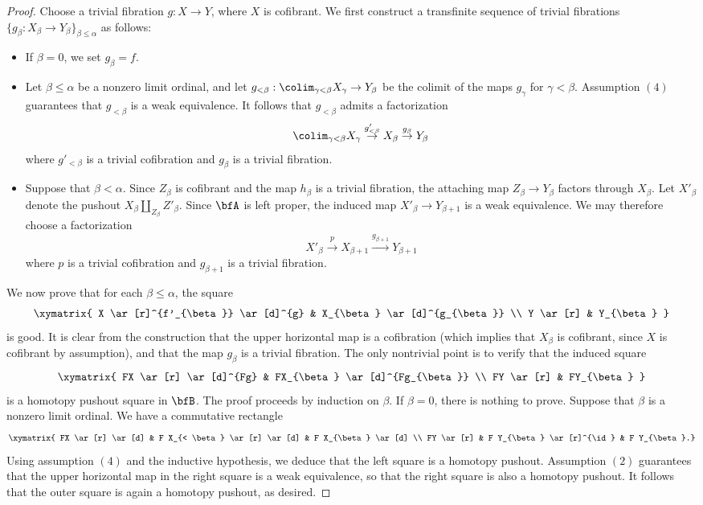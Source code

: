 \begin{proof}
Choose a trivial fibration $g: X \rightarrow Y$, where $X$ is cofibrant. We first construct a transfinite sequence of trivial fibrations 
$\{ g_{\beta}: X_{\beta} \rightarrow Y_{\beta} \}_{\beta \leq \alpha}$ as follows:
\begin{itemize}
\item If $\beta = 0$, we set $g_{\beta} = f$.
\item Let $\beta \leq \alpha$ be a nonzero limit ordinal, and let 
$g_{< \beta}: \colim_{ \gamma < \beta} X_{\gamma} \rightarrow Y_{\beta}$ be the colimit of the maps
$g_{\gamma}$ for $\gamma < \beta$. Assumption $(4)$ guarantees that $g_{< \beta}$ is a weak equivalence. It follows that $g_{< \beta}$ admits a factorization
$$ \colim_{ \gamma < \beta} X_{\gamma} \stackrel{ g'_{< \beta}}{\rightarrow} X_{\beta}
\stackrel{g_{\beta}}{\rightarrow} Y_{\beta}$$
where $g'_{< \beta}$ is a trivial cofibration and $g_{\beta}$ is a trivial fibration.
\item Suppose that $\beta < \alpha$. Since $Z_{\beta}$ is cofibrant and the map $h_{\beta}$ is
a trivial fibration, the attaching map $Z_{\beta} \rightarrow Y_{\beta}$ factors through $X_{\beta}$.
Let $X'_{\beta}$ denote the pushout $X_{\beta} \coprod_{ Z_{\beta} } Z'_{\beta}$. Since $\bfA$
is left proper, the induced map $X'_{\beta} \rightarrow Y_{\beta+1}$ is a weak equivalence.
We may therefore choose a factorization
$$ X'_{\beta} \stackrel{p}{\rightarrow} X_{\beta+1} \stackrel{ g_{\beta+1}}{\rightarrow} Y_{\beta+1}$$
where $p$ is a trivial cofibration and $g_{\beta+1}$ is a trivial fibration. 
\end{itemize}
We now prove that for each $\beta \leq \alpha$, the square
$$ \xymatrix{ X \ar[r]^{f'_{\beta}} \ar[d]^{g} & X_{\beta} \ar[d]^{g_{\beta}} \\
Y \ar[r] & Y_{\beta} }$$
is good. It is clear from the construction that the upper horizontal map is a cofibration (which implies
that $X_{\beta}$ is cofibrant, since $X$ is cofibrant by assumption), and that the map $g_{\beta}$ is a trivial fibration. The only nontrivial point is to verify that the induced square
$$ \xymatrix{ FX \ar[r] \ar[d]^{Fg} & FX_{\beta} \ar[d]^{Fg_{\beta}} \\
FY \ar[r] & FY_{\beta} }$$
is a homotopy pushout square in $\bfB$. The proof proceeds by induction on $\beta$. If $\beta = 0$, there is nothing to prove. Suppose that $\beta$ is a nonzero limit ordinal. We have a commutative rectangle
$$ \xymatrix{ FX \ar[r] \ar[d] & F X_{< \beta} \ar[r] \ar[d] & F X_{\beta} \ar[d] \\
FY \ar[r] & F Y_{\beta} \ar[r]^{\id} & F Y_{\beta }.}$$
Using assumption $(4)$ and the inductive hypothesis, we deduce that the left square is a homotopy pushout. Assumption $(2)$ guarantees that the upper horizontal map in the right square is a weak equivalence, so that the right square is also a homotopy pushout. It follows that the outer square is again a homotopy pushout, as desired.


\end{proof}
